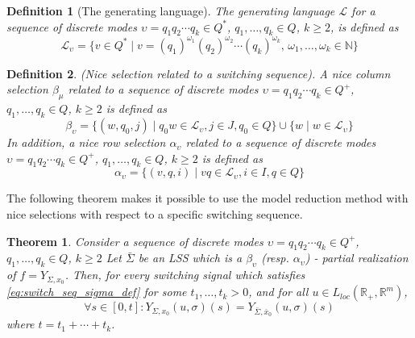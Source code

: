 \documentclass[journal]{IEEEtran}
\newtheorem{Definition}{Definition}
\newtheorem{Theorem}{Theorem}
\begin{document}
\begin{Definition}[The generating language] \label{def:generating_lang}
	The generating language $\mathcal{L}$ for a sequence of discrete modes $\upsilon=q_1q_2 \cdots q_k \in Q^{*}$, $q_1,\ldots, q_k \in Q$, $k \ge 2$, is defined as
	\begin{equation}
		\mathcal{L}_{\upsilon}=\{ v \in Q^* \mid v=(q_1)^{\omega_1}(q_2)^{\omega_2} \cdots (q_k)^{\omega_k} \mbox{, } \omega_1, \dots, \omega_{k} \in \mathbb{N} \}
	\end{equation}
\end{Definition}


\begin{Definition} \label{nice_sel_switch_seq}
	\emph{(Nice selection related to a switching sequence).}
	A nice column selection $\beta_{\mu}$ related to a  sequence
	of discrete modes
	  $\upsilon=q_1q_2 \cdots q_k \in Q^{+}$, $q_1,\ldots, q_k \in Q$, $k \ge 2$ is defined as
\begin{equation}
		\beta_{\upsilon}=\{ (w,q_0,j) \mid q_0w \in \mathcal{L}_{\upsilon}, j \in J, q_0 \in Q \} \cup \{ w \mid w \in \mathcal{L}_{\upsilon} \}
	\end{equation}
	In addition, a nice row selection $\alpha_{\upsilon}$ related to a sequence of discrete modes
	$\upsilon=q_1q_2 \cdots q_k \in Q^{+}$, $q_1,\ldots, q_k \in Q$, $k \ge 2$
	is defined as
	\begin{equation}
		\alpha_{\upsilon}=\{ (v,q,i) \mid vq \in \mathcal{L}_{\upsilon}, i \in I, q \in Q \}
	\end{equation}
\end{Definition}

The following theorem makes it possible to use the model reduction method with nice selections with respect to a specific switching sequence.

\begin{Theorem} \label{thm:nice_sel_switch_seq}
	Consider a sequence of discrete modes
	$\upsilon=q_1q_2 \cdots q_k \in Q^{+}$, $q_1,\ldots, q_k \in Q$, $k \ge 2$
Let $\bar{\Sigma}$ be an LSS which is a $\beta_\upsilon$ (resp. $\alpha_\upsilon$) - partial realization of $f=Y_{\Sigma,x_0}$. Then, for every switching signal which satisfies \eqref{eq:switch_seq_sigma_def} for some $t_1,\ldots, t_k > 0$, and for all $u \in L_{loc}(\mathbb{R}_+,\mathbb{R}^m)$,
	  \[ \forall s \in [0,t]: Y_{\Sigma,x_0}(u,\sigma)(s)=Y_{\bar{\Sigma},\bar{x}_0}(u,\sigma)(s) \]
	  where $t=t_1+\cdots+t_k$.
\end{Theorem}
\end{document}
